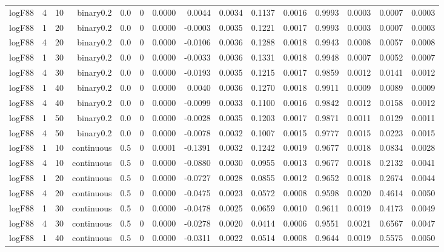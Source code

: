 \begin{longtable}{rrrrrrrrrrrrrrr}
  logF88 & 4 & 10 & binary0.2 & 0.0 & 0 & 0.0000 & 0.0044 & 0.0034 & 0.1137 & 0.0016 & 0.9993 & 0.0003 & 0.0007 & 0.0003 \\ 
  logF88 & 1 & 20 & binary0.2 & 0.0 & 0 & 0.0000 & -0.0003 & 0.0035 & 0.1221 & 0.0017 & 0.9993 & 0.0003 & 0.0007 & 0.0003 \\ 
  logF88 & 4 & 20 & binary0.2 & 0.0 & 0 & 0.0000 & -0.0106 & 0.0036 & 0.1288 & 0.0018 & 0.9943 & 0.0008 & 0.0057 & 0.0008 \\ 
  logF88 & 1 & 30 & binary0.2 & 0.0 & 0 & 0.0000 & -0.0033 & 0.0036 & 0.1331 & 0.0018 & 0.9948 & 0.0007 & 0.0052 & 0.0007 \\ 
  logF88 & 4 & 30 & binary0.2 & 0.0 & 0 & 0.0000 & -0.0193 & 0.0035 & 0.1215 & 0.0017 & 0.9859 & 0.0012 & 0.0141 & 0.0012 \\ 
  logF88 & 1 & 40 & binary0.2 & 0.0 & 0 & 0.0000 & 0.0040 & 0.0036 & 0.1270 & 0.0018 & 0.9911 & 0.0009 & 0.0089 & 0.0009 \\ 
  logF88 & 4 & 40 & binary0.2 & 0.0 & 0 & 0.0000 & -0.0099 & 0.0033 & 0.1100 & 0.0016 & 0.9842 & 0.0012 & 0.0158 & 0.0012 \\ 
  logF88 & 1 & 50 & binary0.2 & 0.0 & 0 & 0.0000 & -0.0028 & 0.0035 & 0.1203 & 0.0017 & 0.9871 & 0.0011 & 0.0129 & 0.0011 \\ 
  logF88 & 4 & 50 & binary0.2 & 0.0 & 0 & 0.0000 & -0.0078 & 0.0032 & 0.1007 & 0.0015 & 0.9777 & 0.0015 & 0.0223 & 0.0015 \\ 
  logF88 & 1 & 10 & continuous & 0.5 & 0 & 0.0001 & -0.1391 & 0.0032 & 0.1242 & 0.0019 & 0.9677 & 0.0018 & 0.0834 & 0.0028 \\ 
  logF88 & 4 & 10 & continuous & 0.5 & 0 & 0.0000 & -0.0880 & 0.0030 & 0.0955 & 0.0013 & 0.9677 & 0.0018 & 0.2132 & 0.0041 \\ 
  logF88 & 1 & 20 & continuous & 0.5 & 0 & 0.0000 & -0.0727 & 0.0028 & 0.0855 & 0.0012 & 0.9652 & 0.0018 & 0.2674 & 0.0044 \\ 
  logF88 & 4 & 20 & continuous & 0.5 & 0 & 0.0000 & -0.0475 & 0.0023 & 0.0572 & 0.0008 & 0.9598 & 0.0020 & 0.4614 & 0.0050 \\ 
  logF88 & 1 & 30 & continuous & 0.5 & 0 & 0.0000 & -0.0478 & 0.0025 & 0.0659 & 0.0010 & 0.9611 & 0.0019 & 0.4173 & 0.0049 \\ 
  logF88 & 4 & 30 & continuous & 0.5 & 0 & 0.0000 & -0.0278 & 0.0020 & 0.0414 & 0.0006 & 0.9551 & 0.0021 & 0.6567 & 0.0047 \\ 
  logF88 & 1 & 40 & continuous & 0.5 & 0 & 0.0000 & -0.0311 & 0.0022 & 0.0514 & 0.0008 & 0.9644 & 0.0019 & 0.5575 & 0.0050 \\ 

\end{longtable}
